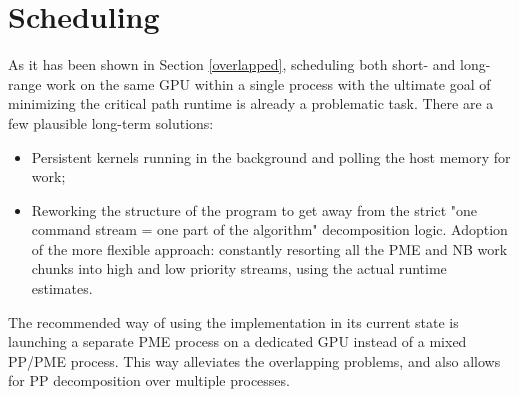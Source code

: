 \documentclass[12pt,a4paper,notitlepage]{report}
\begin{document}
\section{Scheduling}

As it has been shown in Section \ref{overlapped}, scheduling both short- and long-range work on the same GPU within a single process with the ultimate goal of minimizing the critical path runtime is already a problematic task.
There are a few plausible long-term solutions: 
\begin{itemize}
\item Persistent kernels running in the background and polling the host memory for work;
\item Reworking the structure of the program to get away from the strict "one command stream = one part of the algorithm" decomposition logic. Adoption of the more flexible approach: constantly resorting all the PME and NB work chunks into high and low priority streams, using the actual runtime estimates.
\end{itemize}

The recommended way of using the implementation in its current state is launching a separate PME process on a dedicated GPU instead of a mixed PP/PME process. This way alleviates the overlapping problems, and also allows for PP decomposition over multiple processes.



\end{document}
